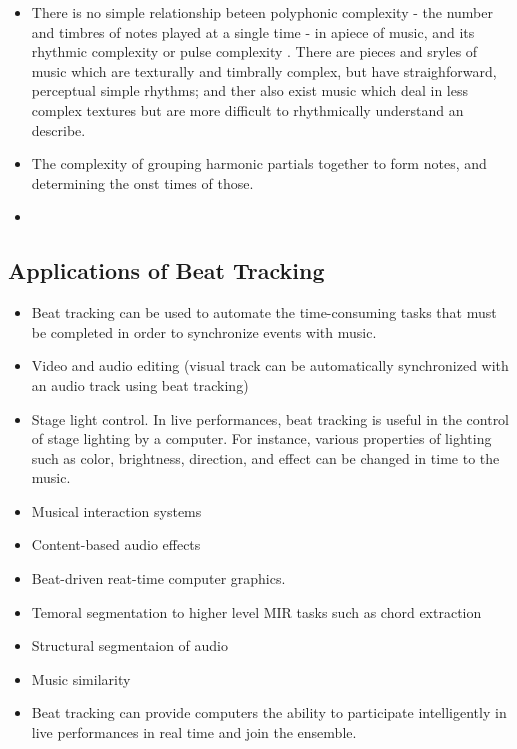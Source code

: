 \documentclass{scrartcl}
\begin{document}
\begin{itemize}
\item There is no simple relationship beteen polyphonic complexity - the number and timbres of notes played at a single time - in apiece of music, and its rhythmic complexity or pulse complexity \cite{Scheirer1998}. There are pieces and sryles of music which are texturally and timbrally complex, but have straighforward, perceptual simple rhythms; and ther also exist music which deal in less complex textures but are more difficult to rhythmically understand an describe.
\item The complexity of grouping harmonic partials together to form notes, and determining the onst times of those.
\item 
\end{itemize}





\subsection{Applications of Beat Tracking}

\begin{itemize}
\item Beat tracking can be used to automate the time-consuming tasks that must be completed in order to synchronize events with music. 
\item Video and audio editing (visual track can be automatically synchronized with an audio track using beat tracking)
\item Stage light control. In live performances, beat tracking is useful in the control of stage lighting by a computer. For instance, various properties of lighting such as color, brightness, direction, and effect can be changed in time to the music.
\item Musical interaction systems \cite{Robertson2007}
\item Content-based audio effects 
\item Beat-driven reat-time computer graphics.
\item Temoral segmentation to higher level MIR tasks such as chord extraction
\item Structural segmentaion of audio
\item Music similarity
\item Beat tracking can provide computers the ability to participate intelligently in live performances in real time and join the ensemble.
\end{itemize}
\end{document}

